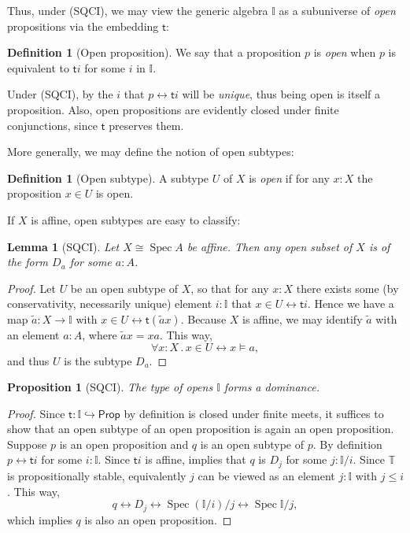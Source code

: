 \documentclass[a4paper,12pt]{amsart}
\newtheorem{lemma}[theorem]{Lemma}
\newtheorem{proposition}[theorem]{Proposition}
\theoremstyle{definition}
\newtheorem{definition}[theorem]{Definition}
\newcommand{\mbb}[1]{\mathbb{#1}}
\newcommand{\T}{\mbb T}
\newcommand{\I}{\mbb I}
\newcommand{\ms}[1]{\mathsf{#1}}
\newcommand{\qsi}[1]{\tilde{#1}}
\newcommand{\hook}{\hookrightarrow}
\newcommand{\fa}[2]{\forall #1\!\colon\!\!#2\mathpunct{.}}
\newcommand{\eq}{\leftrightarrow}
\newcommand{\pp}{\ms{Prop}}
\newcommand{\spec}{\operatorname{Spec}}
\begin{document}
Thus, under (SQCI), we may view the generic algebra $\I$ as a subuniverse of \emph{open} propositions via the embedding $\ms t$:

\begin{definition}[Open proposition]
  We say that a proposition $p$ is \emph{open} when $p$ is equivalent to $\ms ti$ for some $i$ in $\I$.
\end{definition}

Under (SQCI), by  the $i$ that $p \eq \ms ti$ will be \emph{unique}, thus being open is itself a proposition. Also, open propositions are evidently closed under finite conjunctions, since $\ms t$ preserves them. 

More generally, we may define the notion of open subtypes:

\begin{definition}[Open subtype]
  A subtype $U$ of $X$ is \emph{open} if for any $x:X$ the proposition $x\in U$ is open.
\end{definition}

If $X$ is affine, open subtypes are easy to classify:

\begin{lemma}[SQCI]\label{lem:openofaffinegivesalgebra}
  Let $X \cong \spec A$ be affine. Then any open subset of $X$ is of the form $D_a$ for some $a:A$.
\end{lemma}
\begin{proof}
  Let $U$ be an open subtype of $X$, so that for any $x:X$ there exists some (by conservativity, necessarily unique) element $i:\I$ that $x \in U \eq \ms ti$.
  Hence we have a map $\qsi a \colon X \to \I$ with $x \in U \eq \ms t(\qsi ax)$. Because $X$ is affine, we may identify $\qsi a$ with an element $a:A$, where $\qsi ax = xa$. This way,
  \[ \fa xX x \in U \eq x \models a, \]
  and thus $U$ is the subtype $D_a$.
\end{proof}

\begin{proposition}[SQCI]\label{prop:Idominance}
  The type of opens $\I$ forms a dominance.
\end{proposition}
\begin{proof}
  Since $\ms t \colon \I \hook \pp$ by definition is closed under finite meets, it suffices to show that an open subtype of an open proposition is again an open proposition. Suppose $p$ is an open proposition and $q$ is an open subtype of $p$. By definition $p \eq \ms ti$ for some $i:\I$. Since $\ms ti$ is affine,  implies that $q$ is $D_j$ for some $j : \I/i$. Since $\T$ is propositionally stable, equivalently $j$ can be viewed as an element $j : \I$ with $j \le i$. This way, 
  \[ q \eq D_j \eq \spec(\I/i)/j \eq \spec\I/j, \]
  which implies $q$ is also an open proposition.
\end{proof}
\end{document}
